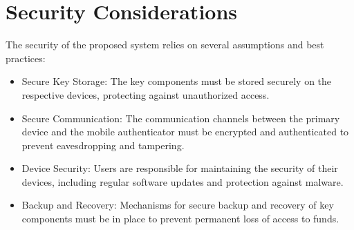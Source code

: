 \section{Security Considerations}
The security of the proposed system relies on several assumptions and best practices:
\begin{itemize}
\item Secure Key Storage: The key components must be stored securely on the respective devices, protecting against unauthorized access.
\item Secure Communication: The communication channels between the primary device and the mobile authenticator must be encrypted and authenticated to prevent eavesdropping and tampering.
\item Device Security: Users are responsible for maintaining the security of their devices, including regular software updates and protection against malware.
\item Backup and Recovery: Mechanisms for secure backup and recovery of key components must be in place to prevent permanent loss of access to funds.
\end{itemize}
